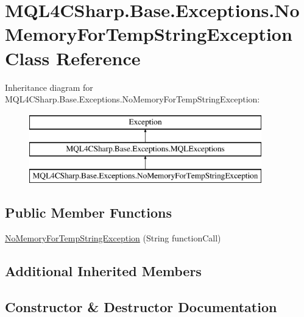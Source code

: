 \hypertarget{class_m_q_l4_c_sharp_1_1_base_1_1_exceptions_1_1_no_memory_for_temp_string_exception}{}\section{M\+Q\+L4\+C\+Sharp.\+Base.\+Exceptions.\+No\+Memory\+For\+Temp\+String\+Exception Class Reference}
\label{class_m_q_l4_c_sharp_1_1_base_1_1_exceptions_1_1_no_memory_for_temp_string_exception}
Inheritance diagram for M\+Q\+L4\+C\+Sharp.\+Base.\+Exceptions.\+No\+Memory\+For\+Temp\+String\+Exception\+:\begin{figure}[H]
\begin{center}
\leavevmode
\includegraphics[height=3.000000cm]{class_m_q_l4_c_sharp_1_1_base_1_1_exceptions_1_1_no_memory_for_temp_string_exception}
\end{center}
\end{figure}
\subsection*{Public Member Functions}
\begin{DoxyCompactItemize}
\item 
\hyperlink{class_m_q_l4_c_sharp_1_1_base_1_1_exceptions_1_1_no_memory_for_temp_string_exception_a71b91e9a388b0be187ec43d2cfab6ac2}{No\+Memory\+For\+Temp\+String\+Exception} (String function\+Call)
\end{DoxyCompactItemize}
\subsection*{Additional Inherited Members}


\subsection{Constructor \& Destructor Documentation}
